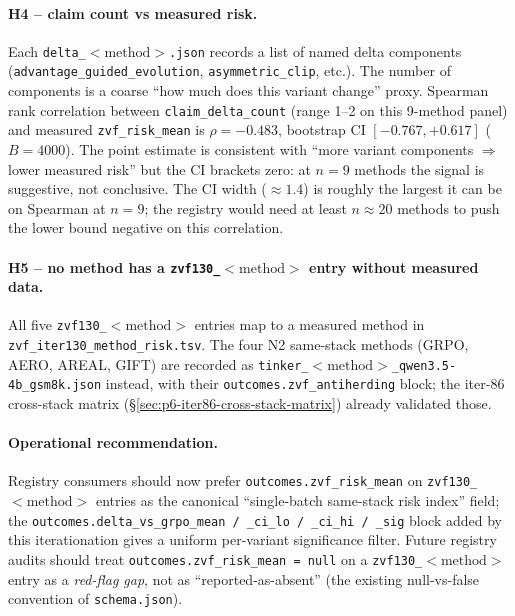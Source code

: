 \paragraph{H4 -- claim count vs measured risk.}
Each \texttt{delta\_$<\mathrm{method}>$.json} records a list of named
delta components (\texttt{advantage\_guided\_evolution},
\texttt{asymmetric\_clip}, etc.). The number of components is a coarse
``how much does this variant change'' proxy. Spearman rank correlation
between \texttt{claim\_delta\_count} (range 1--2 on this 9-method panel)
and measured \texttt{zvf\_risk\_mean} is $\rho{=}{-}0.483$, bootstrap CI
$[-0.767, +0.617]$ ($B{=}4000$). The point estimate is consistent with
``more variant components $\Rightarrow$ lower measured risk'' but the CI
brackets zero: at $n{=}9$ methods the signal is suggestive, not
conclusive. The CI width ($\approx 1.4$) is roughly the largest it can be
on Spearman at $n{=}9$; the registry would need at least $n{\approx}20$
methods to push the lower bound negative on this correlation.

\paragraph{H5 -- no method has a \texttt{zvf130\_$<\mathrm{method}>$} entry without measured data.}
All five \texttt{zvf130\_$<\mathrm{method}>$} entries map to a measured
method in \texttt{zvf\_iter130\_method\_risk.tsv}. The four N2 same-stack
methods (GRPO, AERO, AREAL, GIFT) are recorded as
\texttt{tinker\_$<\mathrm{method}>$\_qwen3.5-4b\_gsm8k.json} instead, with
their \texttt{outcomes.zvf\_antiherding} block; the iter-86 cross-stack
matrix (\S\ref{sec:p6-iter86-cross-stack-matrix}) already validated those.

\paragraph{Operational recommendation.}
Registry consumers should now prefer \texttt{outcomes.zvf\_risk\_mean}
on \texttt{zvf130\_$<\mathrm{method}>$} entries as the canonical
``single-batch same-stack risk index'' field; the
\texttt{outcomes.delta\_vs\_grpo\_mean / \_ci\_lo / \_ci\_hi / \_sig} block
added by this iterationation gives a uniform per-variant significance filter.
Future registry audits should treat
\texttt{outcomes.zvf\_risk\_mean = null} on a \texttt{zvf130\_$<\mathrm{method}>$}
entry as a \emph{red-flag gap}, not as ``reported-as-absent'' (the existing
null-vs-false convention of \texttt{schema.json}).

